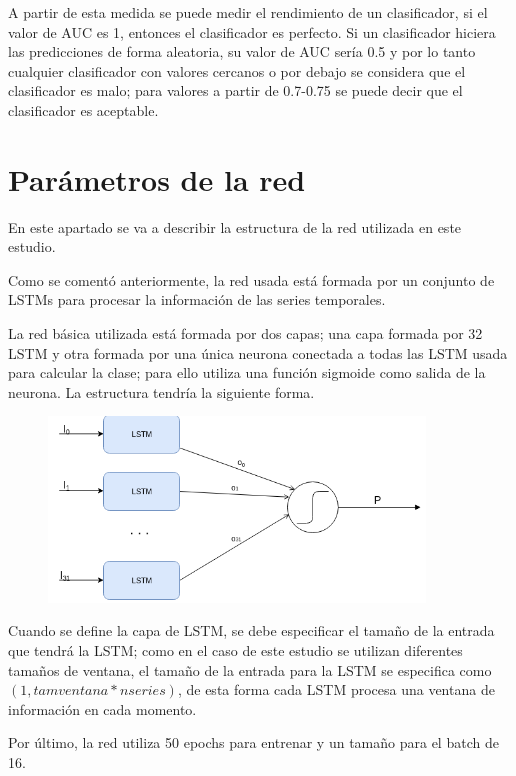 A partir de esta medida se puede medir el rendimiento de un clasificador, si el valor de AUC es 1, entonces el clasificador es perfecto. Si un clasificador hiciera las predicciones de forma aleatoria, su valor de AUC sería 0.5 y por lo tanto cualquier clasificador con valores cercanos o por debajo se considera que el clasificador es malo; para valores a partir de 0.7-0.75 se puede decir que el clasificador es aceptable.

\section{Parámetros de la red}
En este apartado se va a describir la estructura de la red utilizada en este estudio.\newline

Como se comentó anteriormente, la red usada está formada por un conjunto de LSTMs para procesar la información de las series temporales.\newline

La red básica utilizada está formada por dos capas; una capa formada por 32 LSTM y otra formada por una única neurona conectada a todas las LSTM usada para calcular la clase; para ello utiliza una función sigmoide como salida de la neurona. La estructura tendría la siguiente forma.\newline

\begin{figure}[h]
	\centering
	\includegraphics[width=100mm]{imagenes/Estructura_Red.png}
	\label{fig:15}
\end{figure}
\verticalspace
Cuando se define la capa de LSTM, se debe especificar el tamaño de la entrada que tendrá la LSTM; como en el caso de este estudio se utilizan diferentes tamaños de ventana, el tamaño de la entrada para la LSTM se especifica como $(1, tamventana * nseries )$, de esta forma cada LSTM procesa una ventana de información en cada momento.\newline

Por último, la red utiliza 50 epochs para entrenar y un tamaño para el batch de 16.